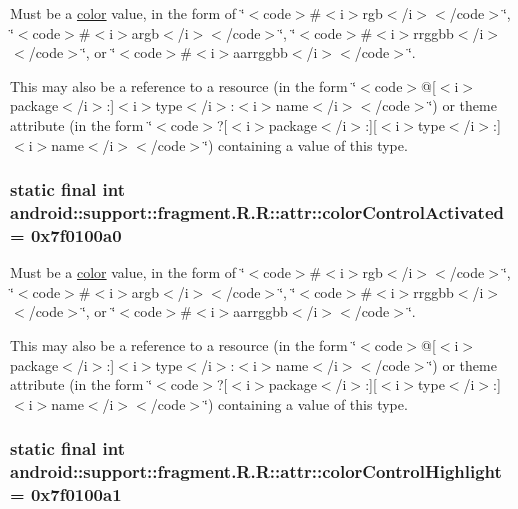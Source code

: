 Must be a \hyperlink{classandroid_1_1support_1_1fragment_1_1_r_1_1color}{color} value, in the form of \char`\"{}$<$code$>$\#$<$i$>$rgb$<$/i$>$$<$/code$>$\char`\"{}, \char`\"{}$<$code$>$\#$<$i$>$argb$<$/i$>$$<$/code$>$\char`\"{}, \char`\"{}$<$code$>$\#$<$i$>$rrggbb$<$/i$>$$<$/code$>$\char`\"{}, or \char`\"{}$<$code$>$\#$<$i$>$aarrggbb$<$/i$>$$<$/code$>$\char`\"{}. 

This may also be a reference to a resource (in the form \char`\"{}$<$code$>$@\mbox{[}$<$i$>$package$<$/i$>$:\mbox{]}$<$i$>$type$<$/i$>$:$<$i$>$name$<$/i$>$$<$/code$>$\char`\"{}) or theme attribute (in the form \char`\"{}$<$code$>$?\mbox{[}$<$i$>$package$<$/i$>$:\mbox{]}\mbox{[}$<$i$>$type$<$/i$>$:\mbox{]}$<$i$>$name$<$/i$>$$<$/code$>$\char`\"{}) containing a value of this type. \hypertarget{classandroid_1_1support_1_1fragment_1_1_r_1_1attr_69561ae205d68dae91f39c2e866f2159}{
\subsubsection[{colorControlActivated}]{\setlength{\rightskip}{0pt plus 5cm}static final int android::support::fragment.R.R::attr::colorControlActivated = 0x7f0100a0}}
\label{classandroid_1_1support_1_1fragment_1_1_r_1_1attr_69561ae205d68dae91f39c2e866f2159}


Must be a \hyperlink{classandroid_1_1support_1_1fragment_1_1_r_1_1color}{color} value, in the form of \char`\"{}$<$code$>$\#$<$i$>$rgb$<$/i$>$$<$/code$>$\char`\"{}, \char`\"{}$<$code$>$\#$<$i$>$argb$<$/i$>$$<$/code$>$\char`\"{}, \char`\"{}$<$code$>$\#$<$i$>$rrggbb$<$/i$>$$<$/code$>$\char`\"{}, or \char`\"{}$<$code$>$\#$<$i$>$aarrggbb$<$/i$>$$<$/code$>$\char`\"{}. 

This may also be a reference to a resource (in the form \char`\"{}$<$code$>$@\mbox{[}$<$i$>$package$<$/i$>$:\mbox{]}$<$i$>$type$<$/i$>$:$<$i$>$name$<$/i$>$$<$/code$>$\char`\"{}) or theme attribute (in the form \char`\"{}$<$code$>$?\mbox{[}$<$i$>$package$<$/i$>$:\mbox{]}\mbox{[}$<$i$>$type$<$/i$>$:\mbox{]}$<$i$>$name$<$/i$>$$<$/code$>$\char`\"{}) containing a value of this type. \hypertarget{classandroid_1_1support_1_1fragment_1_1_r_1_1attr_80a995ab970765226dee1e6490a78ea6}{
\subsubsection[{colorControlHighlight}]{\setlength{\rightskip}{0pt plus 5cm}static final int android::support::fragment.R.R::attr::colorControlHighlight = 0x7f0100a1}}
\label{classandroid_1_1support_1_1fragment_1_1_r_1_1attr_80a995ab970765226dee1e6490a78ea6}


